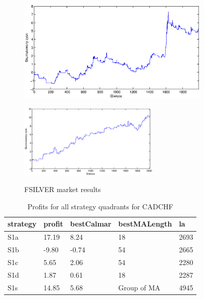 \documentclass{tewiart}
\begin{document}
\begin{figure}[h]
\begin{minipage}{.49\linewidth}
\centering 
\includegraphics[width=0.82\textwidth]{images/S1d_silver.eps}
\label{mansard}
\end{minipage}
\begin{minipage}{\linewidth}
\centering 
\includegraphics[width=0.6\textwidth]{images/S1s_silver.eps}
\label{mansard}
\end{minipage}
\caption{FSILVER market results}
\end{figure}
\FloatBarrier


\newpage
\begin{table}[!t]
\caption{Profits for all strategy quadrants for CADCHF}
 \begin{center}
 \begin{tabular}{|l|l|l|l|l|}
 \hline \textbf{strategy} & \textbf{profit} & \textbf{bestCalmar} & \textbf{bestMALength} & \textbf{la} \\ \hline
S1a & 17.19 & 8.24 & 18 & 2693\\ \hline
S1b & -9.80 & -0.74 & 54 & 2665\\ \hline
S1c & 5.65 & 2.06 & 54 & 2280\\ \hline
S1d & 1.87 & 0.61 & 18 & 2287\\ \hline
S1s & 14.85 & 5.68 & Group of MA & 4945\\
\hline \end{tabular}
 \end{center}
 \end{table}
\FloatBarrier
\end{document}
